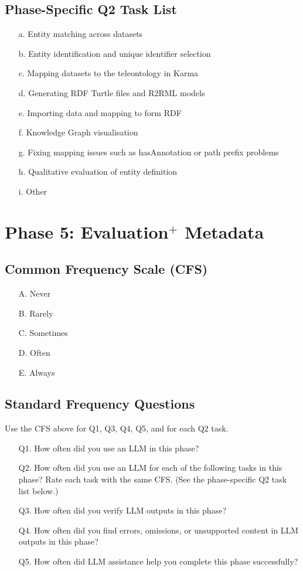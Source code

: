 \subsection*{Phase-Specific Q2 Task List}
\begin{enumerate}
  \item[a.] Entity matching across datasets
  \item[b.] Entity identification and unique identifier selection
  \item[c.] Mapping datasets to the teleontology in Karma
  \item[d.] Generating RDF Turtle files and R2RML models
  \item[e.] Importing data and mapping to form RDF
  \item[f.] Knowledge Graph visualisation
  \item[g.] Fixing mapping issues such as hasAnnotation or path prefix problems
  \item[h.] Qualitative evaluation of entity definition
  \item[i.] Other
\end{enumerate}

\section*{Phase 5: Evaluation$^{+}$ Metadata}

\subsection*{Common Frequency Scale (CFS)}
\begin{itemize}
  \item[A.] Never
  \item[B.] Rarely
  \item[C.] Sometimes
  \item[D.] Often
  \item[E.] Always
\end{itemize}

\subsection*{Standard Frequency Questions}
Use the CFS above for Q1, Q3, Q4, Q5, and for each Q2 task.
\begin{enumerate}
  \item[Q1.] How often did you use an LLM in this phase?
  \item[Q2.] How often did you use an LLM for each of the following tasks in this phase? Rate each task with the same CFS. (See the phase-specific Q2 task list below.)
  \item[Q3.] How often did you verify LLM outputs in this phase?
  \item[Q4.] How often did you find errors, omissions, or unsupported content in LLM outputs in this phase?
  \item[Q5.] How often did LLM assistance help you complete this phase successfully?
\end{enumerate}

